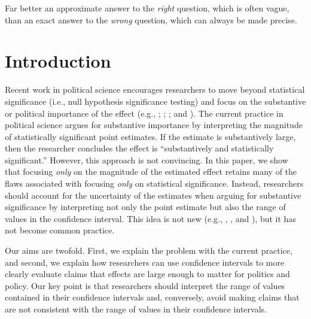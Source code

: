 \documentclass[12pt]{article}
\begin{document}
\epigraph{Far better an approximate answer to the \textit{right} question, which is often vague, than an exact answer to the \textit{wrong} question, which can always be made precise.}{\citet[pp. 13-14]{Tukey1962}}

\thispagestyle{empty}

\newpage
\doublespace

\section*{Introduction}

Recent work in political science encourages researchers to move beyond statistical significance (i.e., null hypothesis significance testing) and focus on the substantive or political importance of the effect (e.g., \citealt{KingTomzWittenberg2000}; \citealt{HanmerKalkan2013}; \citealt{EsareyDanneman2014}; and \citealt{Gross2014}). The current practice in political science argues for substantive importance by interpreting the magnitude of statistically significant point estimates. If the estimate is substantively large, then the researcher concludes the effect is ``substantively and statistically significant.'' However, this approach is not convincing. In this paper, we show that focusing \emph{only} on the magnitude of the estimated effect retains many of the flaws associated with focusing \emph{only} on statistical significance. Instead, researchers should account for the uncertainty of the estimates when arguing for substantive significance by interpreting not only the point estimate but also the range of values in the confidence interval. This idea is not new (e.g., \citealt{Achen1982}, \citealt{Gross2014}, and \citealt{Rainey2014a}), but it has not become common practice. 

Our aims are twofold. First, we explain the problem with the current practice, and second, we explain how researchers can use confidence intervals to more clearly evaluate claims that effects are large enough to matter for politics and policy. Our key point is that researchers should interpret the range of values contained in their confidence intervals and, conversely, avoid making claims that are not consistent with the range of values in their confidence intervals.
\end{document}
